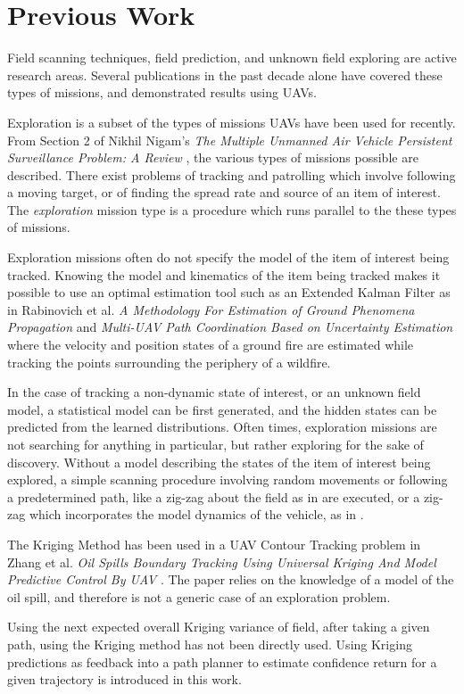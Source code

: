 \chapter{Previous Work}
Field scanning techniques, field prediction, and unknown field exploring are active research areas. Several publications in the past decade alone have covered these types of missions, and demonstrated results using UAVs.

Exploration is a subset of the types of missions UAVs have been used for recently. From Section 2 of Nikhil Nigam's \textit{The Multiple Unmanned Air Vehicle Persistent Surveillance Problem: A Review} \cite{nigam:missions}, the various types of missions possible are described. There exist problems of tracking and patrolling which involve following a moving target, or of finding the spread rate and source of an item of interest. The \textit{exploration} mission type is a procedure which runs parallel to the these types of missions. 

Exploration missions often do not specify the model of the item of interest being tracked. Knowing the model and kinematics of the item being tracked makes it possible to use an optimal estimation tool such as an Extended Kalman Filter as in Rabinovich et al. \textit{A Methodology For Estimation of Ground Phenomena Propagation} \cite{sharon:uav_est} and \textit{Multi-UAV Path Coordination Based on Uncertainty Estimation} \cite{sharon:uav_uncert} where the velocity and position states of a ground fire are estimated while tracking the points surrounding the periphery of a wildfire. 

In the case of tracking a non-dynamic state of interest, or an unknown field model, a statistical model can be first generated, and the hidden states can be predicted from the learned distributions. Often times, exploration missions are not searching for anything in particular, but rather exploring for the sake of discovery. Without a model describing the states of the item of interest being explored, a simple scanning procedure involving random movements or following a predetermined path, like a zig-zag about the field as in \cite{semsch:uav_zig} are executed, or a zig-zag which incorporates the model dynamics of the vehicle, as in \cite{nigam:zigzag}.

The Kriging Method has been used in a UAV Contour Tracking problem in Zhang et al. \textit{Oil Spills Boundary Tracking Using Universal Kriging And Model Predictive Control By UAV} \cite{zhang:oil_krig}. The paper relies on the knowledge of a model of the oil spill, and therefore is not a generic case of an exploration problem. 

Using the next expected overall Kriging variance of field, after taking a given path, using the Kriging method has not been directly used. Using Kriging predictions as feedback into a path planner to estimate confidence return for a given trajectory is introduced in this work.